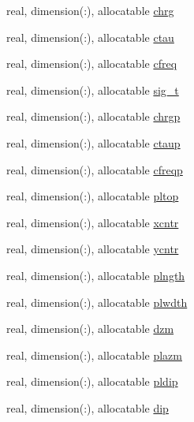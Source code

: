 \begin{DoxyCompactItemize}
\item 
real, dimension(\+:), allocatable \hyperlink{namespacelg__input__routines_a1653ca16fcac1be1d1e8449d3bcea089}{chrg}
\item 
real, dimension(\+:), allocatable \hyperlink{namespacelg__input__routines_ac8bb200fd8bf044a20d5445759fab02c}{ctau}
\item 
real, dimension(\+:), allocatable \hyperlink{namespacelg__input__routines_aa9fa43a162e95877320d121ab31b958d}{cfreq}
\item 
real, dimension(\+:), allocatable \hyperlink{namespacelg__input__routines_a3faaed94e2a40a7d19af4bf0b4e9f8cf}{sig\+\_\+t}
\item 
real, dimension(\+:), allocatable \hyperlink{namespacelg__input__routines_a05b7b31b77371774e886aadf410be79e}{chrgp}
\item 
real, dimension(\+:), allocatable \hyperlink{namespacelg__input__routines_a4ca057c77a03e564a388368be839cd43}{ctaup}
\item 
real, dimension(\+:), allocatable \hyperlink{namespacelg__input__routines_a39583b1655c1a6964d1e80639879060b}{cfreqp}
\item 
real, dimension(\+:), allocatable \hyperlink{namespacelg__input__routines_ad8ae00121fa40a63aab71d92b83d5506}{pltop}
\item 
real, dimension(\+:), allocatable \hyperlink{namespacelg__input__routines_ab251caca089824152c534b93625579db}{xcntr}
\item 
real, dimension(\+:), allocatable \hyperlink{namespacelg__input__routines_a72b37b88e326c2674a9dfad3146d0d1a}{ycntr}
\item 
real, dimension(\+:), allocatable \hyperlink{namespacelg__input__routines_a03aa89b2ee045a49ecf9b35b1acae19b}{plngth}
\item 
real, dimension(\+:), allocatable \hyperlink{namespacelg__input__routines_a522e8b0feae02752d8143fc403ef2e2a}{plwdth}
\item 
real, dimension(\+:), allocatable \hyperlink{namespacelg__input__routines_ac8e6a73637bd5b85bdfbfc0734b3e44a}{dzm}
\item 
real, dimension(\+:), allocatable \hyperlink{namespacelg__input__routines_a6d226e3be6f444eac6f99d17e5218516}{plazm}
\item 
real, dimension(\+:), allocatable \hyperlink{namespacelg__input__routines_ac6bd69a2747719d0ad644d5ef9d7cb19}{pldip}
\item 
real, dimension(\+:), allocatable \hyperlink{namespacelg__input__routines_ac11fcc9d6ce359143f3e92b12bc56633}{dip}

\end{DoxyCompactItemize}
